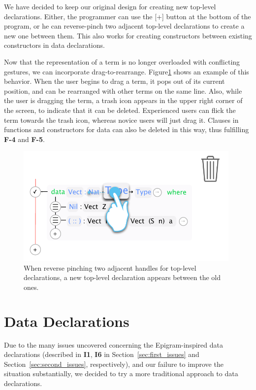 We have decided to keep our original design for creating new top-level
declarations. Either, the programmer can use the [+] button at the bottom of
the program, or he can reverse-pinch two adjacent top-level declarations to
create a new one between them. This also works for creating constructors
between existing constructors in data declarations.

Now that the representation of a term is no longer overloaded with conflicting
gestures, we can incorporate drag-to-rearrange. Figure\ref{fig:design_drag_to_garbage}
shows an example of this behavior. When the user begins to drag a term, it pops
out of its current position, and can be rearranged with other terms on the same
line. Also, while the user is dragging the term, a trash icon appears in the
upper right corner of the screen, to indicate that it can be deleted. Experienced users can flick the term towards the trash icon, whereas novice users will just drag it.
Clauses in functions and constructors for data can also be deleted in this way, thus fulfilling \textbf{F-4} and \textbf{F-5}.

\begin{figure}
	\centering
		\includegraphics[width=110mm]{diagrams/design_drag_to_garbage.pdf}
	\caption{When reverse pinching two adjacent handles for top-level
	declarations, a new top-level declaration appears between the old ones.}
\label{fig:design_drag_to_garbage}
\end{figure}

\section{Data Declarations}
\label{subsec:new_design_data_dec}
Due to the many issues uncovered concerning the Epigram-inspired data declarations (described in \textbf{I1}, \textbf{I6} in Section~\ref{sec:first_issues} and Section~\ref{sec:second_issues}, respectively), and our failure to improve the situation substantially, we decided to try a more traditional approach to data declarations.

